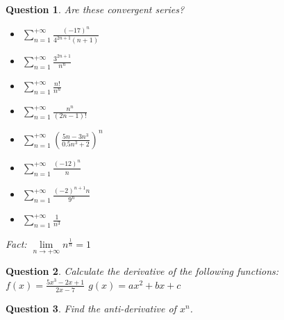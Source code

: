 \documentclass[]{article}
\newtheorem{question}{Question}
\begin{document}
\begin{question}
	Are these convergent series?
	\begin{itemize}
		\item $\sum_{n=1}^{+\infty}\frac{(-17)^n}{4^{2n+1}(n+1)}$
		\item $\sum_{n=1}^{+\infty}\frac{3^{2n+1}}{n^n}$
		\item $\sum_{n=1}^{+\infty}\frac{n!}{n^n}$
		\item $\sum_{n=1}^{+\infty}\frac{n^n}{(2n-1)!}$
		\item $\sum_{n=1}^{+\infty}\left( \frac{5n-3n^3}{0.5n^3+2} \right)^n$
		\item $\sum_{n=1}^{+\infty}\frac{(-12)^n}{n}$
		\item $\sum_{n=1}^{+\infty}\frac{(-2)^{n+1}n}{9^n}$
		\item $\sum_{n=1}^{+\infty}\frac{1}{n^3}$
	\end{itemize}
	Fact: $\lim\limits_{n \to +\infty} n^{\frac{1}{n}}=1$
\end{question}


\begin{question}
	Calculate the derivative of the following functions:\\
	$f(x) = \frac{5x^3-2x+1}{2x-7}$
	$g(x) = ax^2+bx+c$
\end{question}

\begin{question}
	Find the anti-derivative of $x^n$.
\end{question}
\end{document}
